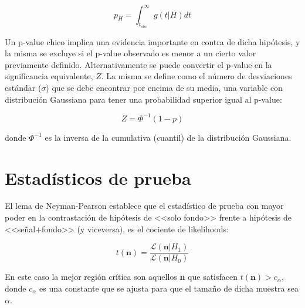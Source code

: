 \begin{equation}
	p_H = \int_{t_{obs}}^{\infty} g(t|H)dt
\end{equation}

Un p-value chico implica una evidencia importante en contra de dicha hipótesis, y la misma se excluye si el p-value observado es menor a un cierto valor previamente definido.  Alternativamente se puede convertir el p-value en la significancia equivalente, $Z$. La misma se define como el número de desviaciones estándar ($\sigma$) que se debe encontrar por encima de su media, una variable con distribución Gaussiana para tener una probabilidad superior igual al p-value:

\begin{equation}
	Z=\Phi^{-1}(1-p)
	\label{ec:sign}
\end{equation}

\noindent
donde $\Phi^{-1}$ es la inversa de la cumulativa (cuantil) de la distribución Gaussiana. 


\section{Estadísticos de prueba}


El lema de Neyman-Pearson \cite{10.2307/91247} establece que el estadístico de prueba con mayor poder en la contrastación de hipótesis de <<solo fondo>> frente a hipótesis de <<señal+fondo>> (y viceversa), es el cociente de likelihoods:


\begin{equation}
	t(\textbf{n}) = \frac{\mathcal{L}(\textbf{n}|H_1)}{\mathcal{L}(\textbf{n}|H_0)}
\end{equation}

En este caso la mejor región crítica son aquellos \textbf{n} que satisfacen $t(\textbf{n})>c_\alpha$, donde $c_\alpha$ es una constante que se ajusta para que el tamaño de dicha muestra sea $\alpha$.

